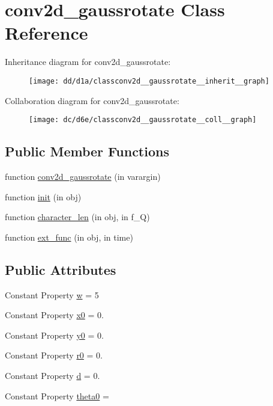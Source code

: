 \hypertarget{classconv2d__gaussrotate}{}\section{conv2d\+\_\+gaussrotate Class Reference}
\label{classconv2d__gaussrotate}


Inheritance diagram for conv2d\+\_\+gaussrotate\+:
\nopagebreak
\begin{figure}[H]
\begin{center}
\leavevmode
\texttt{[image: dd/d1a/classconv2d\_\_gaussrotate\_\_inherit\_\_graph]}
\end{center}
\end{figure}


Collaboration diagram for conv2d\+\_\+gaussrotate\+:
\nopagebreak
\begin{figure}[H]
\begin{center}
\leavevmode
\texttt{[image: dc/d6e/classconv2d\_\_gaussrotate\_\_coll\_\_graph]}
\end{center}
\end{figure}
\subsection*{Public Member Functions}
\begin{DoxyCompactItemize}
\item 
function \hyperlink{classconv2d__gaussrotate_a227474d85844e3457bc45b6a71026826}{conv2d\+\_\+gaussrotate} (in varargin)
\item 
function \hyperlink{classconv2d__gaussrotate_ab32437777016595cca28ed2fd3d20260}{init} (in obj)
\item 
function \hyperlink{classconv2d__gaussrotate_a455e3b10962c29d1a5e19eaaf27ee8c0}{character\+\_\+len} (in obj, in f\+\_\+Q)
\item 
function \hyperlink{classconv2d__gaussrotate_a3aa479747961e02124ff869de2d8d893}{ext\+\_\+func} (in obj, in time)
\end{DoxyCompactItemize}
\subsection*{Public Attributes}
\begin{DoxyCompactItemize}
\item 
Constant Property \hyperlink{classconv2d__gaussrotate_a739c0c45b1cb29efa51f7b5dfe9023b5}{w} = 5
\item 
Constant Property \hyperlink{classconv2d__gaussrotate_a6a3324991719cdd2e791ac573a6920bc}{x0} = 0.
\item 
Constant Property \hyperlink{classconv2d__gaussrotate_a3f6005b9dcd530b251bfaa5da609f928}{y0} = 0.
\item 
Constant Property \hyperlink{classconv2d__gaussrotate_a108933e98bd5d3b772f4ed6de5ede98c}{r0} = 0.
\item 
Constant Property \hyperlink{classconv2d__gaussrotate_a296f48146d8b8ca8ac05c662445c2092}{d} = 0.
\item 
Constant Property \hyperlink{classconv2d__gaussrotate_a06d571dd5179a8978110f35b604a9aa5}{theta0} =
\end{DoxyCompactItemize}
